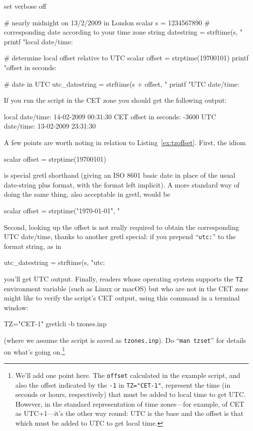 \begin{script}[htbp]
  \label{ex:tzoffset}
\begin{scodebit}
set verbose off

# nearly midnight on 13/2/2009 in London
scalar s = 1234567890
# corresponding date according to your time zone
string datestring = strftime(s, "%
printf "local date/time: %

# determine local offset relative to UTC
scalar offset = strptime(19700101)
printf "offset in seconds: %

# date in UTC
utc_datestring = strftime(s + offset, "%
printf "UTC date/time: %
\end{scodebit}
%
If you run the script in the CET zone you should get the following
output:
\begin{outbit}
local date/time: 14-02-2009 00:31:30 CET
offset in seconds: -3600
UTC date/time: 13-02-2009 23:31:30
\end{outbit}
\end{script}

A few points are worth noting in relation to
Listing~\ref{ex:tzoffset}. First, the idiom
\begin{code}
scalar offset = strptime(19700101)
\end{code}
is special gretl shorthand (giving an ISO 8601 basic date in place of
the usual date-string plus format, with the format left implicit). A more
standard way of doing the same thing, also acceptable in gretl, would
be
\begin{code}
scalar offset = strptime("1970-01-01", "%
\end{code}
Second, looking up the offset is not really required to obtain the
corresponding UTC date/time, thanks to another gretl special: if you
prepend ``\texttt{utc:}'' to the format string, as in
\begin{code}
utc_datestring = strftime(s, "utc:%
\end{code}
you'll get UTC output. Finally, readers whose operating system
supports the \texttt{TZ} environment variable (such as Linux or macOS)
but who are not in the CET zone might like to verify the script's CET
output, using this command in a terminal window:
\begin{code}
TZ="CET-1" gretlcli -b tzones.inp
\end{code}
(where we assume the script is saved as \texttt{tzones.inp}). Do
``\texttt{man tzset}'' for details on what's going on.\footnote{We'll
  add one point here. The \texttt{offset} calculated in the example
  script, and also the offset indicated by the \texttt{-1} in
  \texttt{TZ="CET-1"}, represent the time (in seconds or hours,
  respectively) that must be added to local time to get UTC. However,
  in the standard representation of time zones---for example, of CET
  as UTC+1---it's the other way round: UTC is the base and the offset
  is that which must be added to UTC to get local time.}

